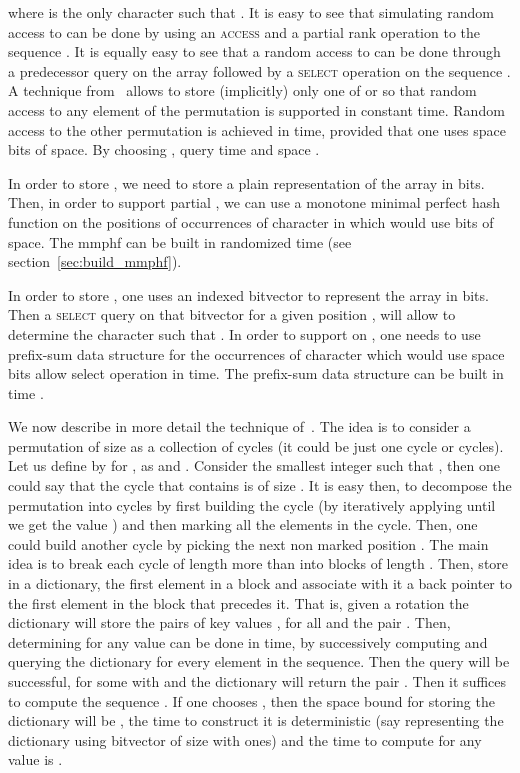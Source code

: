 \documentclass[a4paper]{article}
\begin{document}
\begin{enumerate}
where  is the only character such that . 
It is easy to see that simulating random access to  can be done by using an \textsc{access} and a partial rank operation to the sequence . It is equally easy to see that a random access to  can be done through a predecessor query on the array  followed by a \textsc{select} operation on the sequence . 
A technique from~\cite{munro2003succinct} allows to store (implicitly) 
only one of  or  so that random access 
to any element of the permutation is supported in constant time. 
Random access to the other permutation is achieved in  time, provided 
that one uses space  bits of space. By choosing , 
 query time and space . 

In order to store , we need to store a plain representation 
of the array  in  bits. Then, in order 
to support partial , we can use a monotone 
minimal perfect hash function on the positions 
of occurrences of character  in  
which would use  bits of space. The mmphf 
can be built in randomized  time (see section~\ref{sec:build_mmphf}). 

In order to store , one uses an indexed bitvector to represent the array 
in  bits. Then a \textsc{select} query on that bitvector for a given position
, will allow to determine the character  such that .
In order to support  on , one needs 
to use prefix-sum data structure for the occurrences of character 
 which would use space  bits allow 
select operation in  time. The prefix-sum data structure can be built 
in time . 

We now describe in more detail the technique 
of~\cite{munro2003succinct}. The idea is to consider 
a permutation  of size  as a collection of cycles
(it could be just one cycle or  cycles). Let us 
define by  for , as  
and . 
Consider the smallest integer  such that 
, then one could say that the cycle that
contains  is of size . It is easy then, to 
decompose the permutation  into cycles by first 
building the cycle  
(by iteratively applying  until we get the value ) 
and then marking all the elements in the cycle. Then, one could 
build another cycle by picking the next non marked position . 
The main idea is to break each cycle of length more than  into 
 blocks of length . Then, store in a dictionary, 
the first element in a block and associate with it a back pointer 
to the first element in the block that precedes it. 
That is, given a rotation  
the dictionary will store the pairs of key values , 
for all  and the pair . Then, determining  for any value 
can be done in  time, by successively computing  and querying 
the dictionary for every element in the sequence. Then the query will be successful, for some 
 with  and the dictionary will return the pair . 
Then it suffices to compute the sequence .
If one chooses , then the space bound for storing 
the dictionary will be , the time 
to construct it is deterministic 
(say representing the dictionary using bitvector of size  with 
ones) and the time to compute  for any value  is . 






\end{enumerate}
\end{document}
